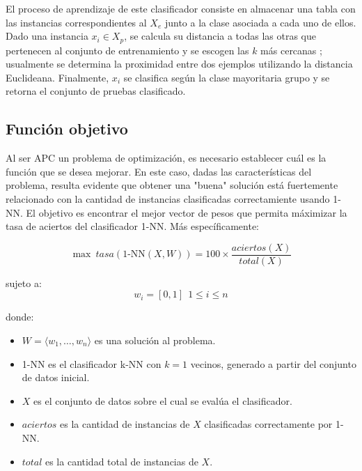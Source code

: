 \documentclass{ci5652}
\begin{document}
El proceso de aprendizaje de este clasificador consiste en almacenar una tabla
con las instancias correspondientes al $X_e$ junto a la clase asociada a cada
uno de ellos. Dado una instancia $x_i \in X_p$, se calcula su distancia a todas
las otras que pertenecen al conjunto de entrenamiento y se escogen las $k$ más
cercanas \cite{Herrera_2017}; usualmente se determina la proximidad entre dos
ejemplos utilizando la distancia Euclideana. Finalmente, $x_i$ se clasifica
según la clase mayoritaria grupo y se retorna el conjunto de pruebas clasificado.


\subsection{Función objetivo}

Al ser APC un problema de optimización, es necesario establecer cuál es la
función que se desea mejorar. En este caso, dadas las características del
problema, resulta evidente que obtener una "buena" solución está fuertemente
relacionado con la cantidad de instancias clasificadas correctamiente usando
1-NN. El objetivo es encontrar el mejor vector de pesos que permita máximizar la
tasa de aciertos del clasificador 1-NN. Más específicamente:

\begin{equation}
  \max\ tasa(\text{1-NN}(X, W)) = 100 \times \frac{aciertos(X)}{total(X)}
\end{equation}

sujeto a:
\[
w_i = [0, 1] \ \ 1 \leq i \leq n
\]

donde:
\begin{itemize}
  \item $W = \langle w_1, \dots, w_n\rangle$ es una solución al problema.
  \item 1-NN es el clasificador k-NN con $k=1$ vecinos, generado a partir del
  conjunto de datos inicial.
  \item $X$ es el conjunto de datos sobre el cual se evalúa el clasificador.
  \item $aciertos$ es la cantidad de instancias de $X$ clasificadas
  correctamente por 1-NN.
  \item $total$ es la cantidad total de instancias de $X$.
\end{itemize}

\end{document}
